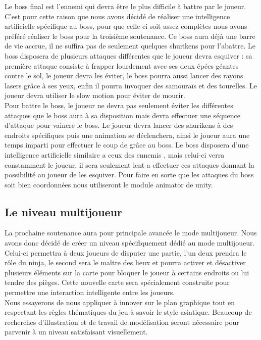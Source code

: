 \documentclass[12pt]{article}
\begin{document}
Le boss final est l'ennemi qui devra être le plus difficile à battre par le joueur. C'est pour cette raison que nous avons décidé de réaliser une intelligence artificielle spécifique au boss, pour que celle-ci soit assez complètes nous avons préféré réaliser le boss pour la troisième soutenance. Ce boss aura déjà une barre de vie accrue, il ne suffira pas de seulement quelques shurikens pour l'abattre. Le boss disposera de plusieurs attaques différentes que le joueur devra esquiver : sa première attaque consiste à frapper lourdement avec ses deux épées géantes contre le sol, le joueur devra les éviter, le boss pourra aussi lancer des rayons lasers grâce à ses yeux, enfin il pourra invoquer des samouraïs et des tourelles. Le joueur devra utiliser le slow motion pour éviter de mourir.\\
Pour battre le boss, le joueur ne devra pas seulement éviter les différentes attaques que le boss aura à sa disposition mais devra effectuer une séquence d'attaque pour vaincre le boss. Le joueur devra lancer des shurikens à des endroits spécifiques puis une animation se déclenchera, ainsi le joueur aura une temps imparti pour effectuer le coup de grâce au boss. Le boss disposera d'une intelligence artificielle similaire a ceux des ennemis , mais celui-ci verra constamment le joueur, il sera seulement lent a effectuer ces attaques donnant la possibilité au joueur de les esquiver. Pour faire en sorte que les attaques du boss soit bien coordonnées nous utiliseront le module animator de unity.

\subsection{Le niveau multijoueur}

La prochaine soutenance aura pour principale avancée le mode multijoueur. Nous avons donc décidé de créer un niveau spécifiquement dédié au mode multijoueur. Celui-ci permettra à deux joueurs de disputer une partie, l'un deux prendra le rôle du ninja, le second sera le maître des lieux et pourra activer et désactiver plusieurs éléments sur la carte pour bloquer le joueur à certains endroits ou lui tendre des pièges. Cette nouvelle carte sera spécialement construite pour permettre une interaction intelligente entre les joueurs.\\

Nous essayerons de nous appliquer à innover sur le plan graphique tout en respectant les règles thématiques du jeu à savoir le style asiatique. Beaucoup de recherches d'illustration et de travail de modélisation seront nécessaire pour parvenir à un niveau satisfaisant visuellement.\\
\end{document}
